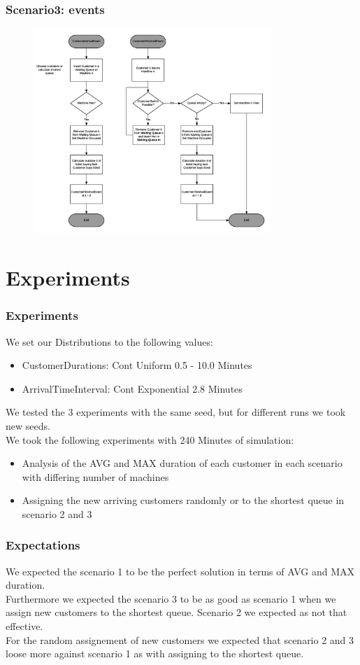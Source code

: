 \documentclass{beamer}
\begin{document}
\begin{frame}
\frametitle{Scenario3: events}
\begin{figure}
\centering
\includegraphics[width=0.8\textwidth]{images/scenario3_diag.png}
\end{figure}
\end{frame}

\section{Experiments}
\begin{frame}
\frametitle{Experiments}
We set our Distributions to the following values:
\begin{itemize}
\item CustomerDurations: Cont Uniform 0.5 - 10.0 Minutes
\item ArrivalTimeInterval: Cont Exponential 2.8 Minutes
\end{itemize}
We tested the 3 experiments with the same seed, but for different runs we took new seeds.\\
We took the following experiments with 240 Minutes of simulation:
\begin{itemize}
\item Analysis of the AVG and MAX duration of each customer in each scenario with differing number of machines
\item Assigning the new arriving customers randomly or to the shortest queue in scenario 2 and 3
\end{itemize}
\end{frame}

\begin{frame}
\frametitle{Expectations}
We expected the scenario 1 to be the perfect solution in terms of AVG and MAX duration.\\
Furthermore we expected the scenario 3 to be as good as scenario 1 when we assign new customers to the shortest queue. Scenario 2 we expected as not that effective. \\
For the random assignement of new customers we expected that scenario 2 and 3 loose more against scenario 1 as with assigning to the shortest queue.
\end{frame}
\end{document}
